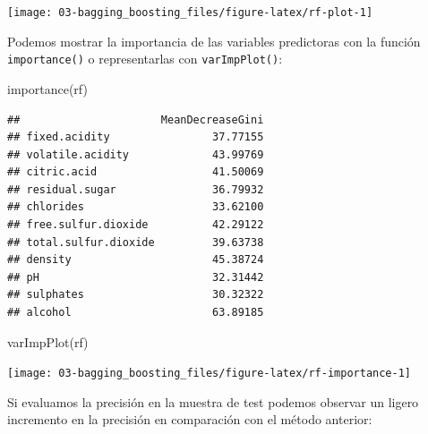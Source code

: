 \documentclass[
  spanish,
]{book}
\newenvironment{Shaded}{\begin{snugshade}}{\end{snugshade}}
\newcommand{\AttributeTok}[1]{\textcolor[rgb]{0.77,0.63,0.00}{#1}}
\newcommand{\FunctionTok}[1]{\textcolor[rgb]{0.00,0.00,0.00}{#1}}
\newcommand{\NormalTok}[1]{#1}
\newcommand{\OtherTok}[1]{\textcolor[rgb]{0.56,0.35,0.01}{#1}}
\newcommand{\SpecialCharTok}[1]{\textcolor[rgb]{0.00,0.00,0.00}{#1}}
\theoremstyle{break}
\theoremstyle{definition}
\theoremstyle{definition}
\theoremstyle{definition}
\theoremstyle{definition}
\theoremstyle{remark}
\begin{document}
\begin{center}\texttt{[image: 03-bagging\_boosting\_files/figure-latex/rf-plot-1]} \end{center}

Podemos mostrar la importancia de las variables predictoras con la función \texttt{importance()} o representarlas con \texttt{varImpPlot()}:

\begin{Shaded}
\begin{Highlighting}[]
\FunctionTok{importance}\NormalTok{(rf)}
\end{Highlighting}
\end{Shaded}

\begin{verbatim}
##                      MeanDecreaseGini
## fixed.acidity                37.77155
## volatile.acidity             43.99769
## citric.acid                  41.50069
## residual.sugar               36.79932
## chlorides                    33.62100
## free.sulfur.dioxide          42.29122
## total.sulfur.dioxide         39.63738
## density                      45.38724
## pH                           32.31442
## sulphates                    30.32322
## alcohol                      63.89185
\end{verbatim}

\begin{Shaded}
\begin{Highlighting}[]
\FunctionTok{varImpPlot}\NormalTok{(rf)}
\end{Highlighting}
\end{Shaded}

\begin{center}\texttt{[image: 03-bagging\_boosting\_files/figure-latex/rf-importance-1]} \end{center}

Si evaluamos la precisión en la muestra de test podemos observar un ligero incremento en la precisión en comparación con el método anterior:

\begin{Shaded}
\end{Shaded}
\end{document}
